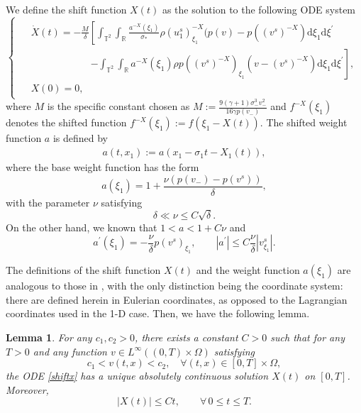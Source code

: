 \documentclass[10pt,reqno]{amsart}
\numberwithin{equation}{section}
\newtheorem{lemma}[theorem]{Lemma}
\newcommand{\dif}{\mathrm{d}}
\begin{document}
We define the shift function $X(t)$ as the solution to the following ODE system
\begin{equation}\label{shiftx}
\begin{cases}
\begin{aligned}
&\dot{X}(t)=-\frac{M}{\delta}
\left[\int_{\mathbb{T}^2}\int_{\mathbb{R}}\frac{a^{-X}(\xi_1)}{\sigma_\ast}
\rho(u^s_1)_{\xi_1}^{-X}(p(v)-p((v^s)^{-X})\dif \xi_1\dif\xi^{\prime}\right.\\
&\qquad\qquad\qquad\left.
-\int_{\mathbb{T}^2}\int_{\mathbb{R}}a^{-X}(\xi_1)\rho p((v^s)^{-X})_{\xi_1}\left(v-(v^s)^{-X}\right)\dif \xi_1\dif\xi^{\prime}\right],\\
&X(0)=0,
\end{aligned}
\end{cases}
\end{equation}
where $M$ is the specific constant chosen as $M:=\frac{9(\gamma+1)\sigma_-^3v_-^2}{16\gamma p(v_-)}$ and $f^{-X}(\xi_1)$ denotes the shifted function $f^{-X}(\xi_1):=f(\xi_1-X(t))$. The shifted weight function $a$ is defined by
\begin{align}\label{weighta}
a(t,x_1):=a(x_1-\sigma_1t-X_1(t)),
\end{align}
where the base weight function has the form
\[
a(\xi_1)=1+\frac{\nu(p(v_-)-p(v^s))}{\delta},
\]
with the parameter $\nu$ satisfying
\[
\delta\ll\nu\le C\sqrt{\delta}.
\]
On the other hand, we known that $1<a<1+C\nu$ and
\begin{equation}\label{weight1}
a^{\prime}(\xi_1)=-\frac{\nu}{\delta}p(v^s)_{\xi_1},\qquad
|a^{\prime}|\le C\frac{\nu}{\delta}|v^s_{\xi_1}|.
\end{equation}

The definitions of the shift function $X(t)$ and the weight function $a(\xi_1)$ are analogous to those in \cite{GHSR, GHSS}, with the only distinction being the coordinate system: there are defined herein in Eulerian coordinates, as opposed to the Lagrangian coordinates used in the 1-D case. Then, we have the following lemma.%
\begin{lemma}\label{le2.2}
For any $c_1, c_2>0$, there exists a constant $C>0$ such that for any $T>0$ and any function $v\in L^{\infty}((0,T )\times \Omega)$ satisfying
\begin{equation}\label{2.18}
c_1<v(t,x)<c_2,\quad \forall(t,x)\in[0, T]\times\Omega,
\end{equation}
the ODE \eqref{shiftx} has a unique absolutely continuous solution $X(t)$ on $[0, T]$. Moreover,
\begin{equation}\label{2.19}
|X(t)|\le C t, \qquad \forall \, 0\le t \le T.
\end{equation}
\end{lemma}
\end{document}

